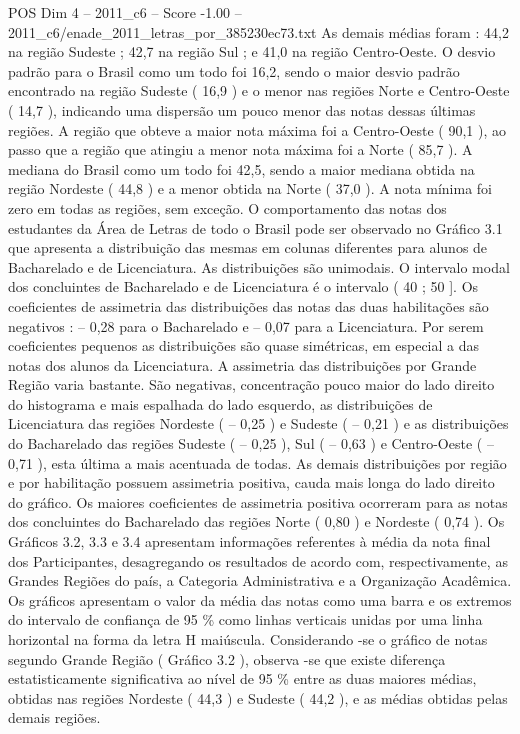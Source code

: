 \begin{textsample}{POS Dim 4 – 2011\_c6 – Score -1.00 – 2011\_c6/enade\_2011\_letras\_por\_385230ec73.txt}
As demais médias foram : 44,2 na região Sudeste ; 42,7 na região Sul ; e 41,0 na região Centro-Oeste.
O desvio padrão para o Brasil como um todo foi 16,2, sendo o maior desvio padrão encontrado na região Sudeste ( 16,9 ) e o menor nas regiões Norte e Centro-Oeste ( 14,7 ), indicando uma dispersão um pouco menor das notas dessas últimas regiões.
A região que obteve a maior nota máxima foi a Centro-Oeste ( 90,1 ), ao passo que a região que atingiu a menor nota máxima foi a Norte ( 85,7 ).
A mediana do Brasil como um todo foi 42,5, sendo a maior mediana obtida na região Nordeste ( 44,8 ) e a menor obtida na Norte ( 37,0 ).
A nota mínima foi zero em todas as regiões, sem exceção.
O comportamento das notas dos estudantes da Área de Letras de todo o Brasil pode ser observado no Gráfico 3.1 que apresenta a distribuição das mesmas em colunas diferentes para alunos de Bacharelado e de Licenciatura.
As distribuições são unimodais.
O intervalo modal dos concluintes de Bacharelado e de Licenciatura é o intervalo ( 40 ; 50 ].
Os coeficientes de assimetria das distribuições das notas das duas habilitações são negativos : – 0,28 para o Bacharelado e – 0,07 para a Licenciatura.
Por serem coeficientes pequenos as distribuições são quase simétricas, em especial a das notas dos alunos da Licenciatura.
A assimetria das distribuições por Grande Região varia bastante.
São negativas, concentração pouco maior do lado direito do histograma e mais espalhada do lado esquerdo, as distribuições de Licenciatura das regiões Nordeste ( – 0,25 ) e Sudeste ( – 0,21 ) e as distribuições do Bacharelado das regiões Sudeste ( – 0,25 ), Sul ( – 0,63 ) e Centro-Oeste ( – 0,71 ), esta última a mais acentuada de todas.
As demais distribuições por região e por habilitação possuem assimetria positiva, cauda mais longa do lado direito do gráfico.
Os maiores coeficientes de assimetria positiva ocorreram para as notas dos concluintes do Bacharelado das regiões Norte ( 0,80 ) e Nordeste ( 0,74 ).
Os Gráficos 3.2, 3.3 e 3.4 apresentam informações referentes à média da nota final dos Participantes, desagregando os resultados de acordo com, respectivamente, as Grandes Regiões do país, a Categoria Administrativa e a Organização Acadêmica.
Os gráficos apresentam o valor da média das notas como uma barra e os extremos do intervalo de confiança de 95 \% como linhas verticais unidas por uma linha horizontal na forma da letra H maiúscula.
Considerando -se o gráfico de notas segundo Grande Região ( Gráfico 3.2 ), observa -se que existe diferença estatisticamente significativa ao nível de 95 \% entre as duas maiores médias, obtidas nas regiões Nordeste ( 44,3 ) e Sudeste ( 44,2 ), e as médias obtidas pelas demais regiões.

\end{textsample}
